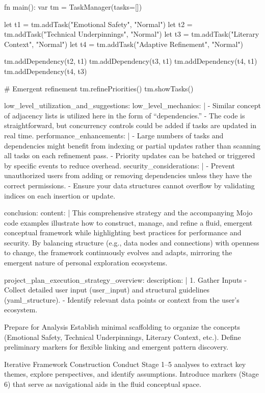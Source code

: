 {    fn main():
        var tm = TaskManager(tasks=[])

        let t1 = tm.addTask("Emotional Safety", "Normal")
        let t2 = tm.addTask("Technical Underpinnings", "Normal")
        let t3 = tm.addTask("Literary Context", "Normal")
        let t4 = tm.addTask("Adaptive Refinement", "Normal")

        tm.addDependency(t2, t1)
        tm.addDependency(t3, t1)
        tm.addDependency(t4, t1)
        tm.addDependency(t4, t3)

        # Emergent refinement
        tm.refinePriorities()
        tm.showTasks()

  low_level_utilization_and_suggestions:
    low_level_mechanics: |
      - Similar concept of adjacency lists is utilized here in the form of “dependencies.”
      - The code is straightforward, but concurrency controls could be added if tasks are updated in real time.
    performance_enhancements: |
      - Large numbers of tasks and dependencies might benefit from indexing or partial updates rather than scanning all tasks on each refinement pass.
      - Priority updates can be batched or triggered by specific events to reduce overhead.
    security_considerations: |
      - Prevent unauthorized users from adding or removing dependencies unless they have the correct permissions.
      - Ensure your data structures cannot overflow by validating indices on each insertion or update.

conclusion:
  content: |
    This comprehensive strategy and the accompanying Mojo code examples illustrate how to construct, manage, and refine a fluid, emergent conceptual framework while highlighting best practices for performance and security. By balancing structure (e.g., data nodes and connections) with openness to change, the framework continuously evolves and adapts, mirroring the emergent nature of personal exploration ecosystems.

project_plan_execution_strategy_overview:
  description: |
    1. Gather Inputs
       - Collect detailed user input ({{user_input}}) and structural guidelines ({{yaml_structure}}).
       - Identify relevant data points or context from the user’s ecosystem.

Prepare for Analysis
Establish minimal scaffolding to organize the concepts (Emotional Safety, Technical Underpinnings, Literary Context, etc.).
Define preliminary markers for flexible linking and emergent pattern discovery.

Iterative Framework Construction
Conduct Stage 1–5 analyses to extract key themes, explore perspectives, and identify assumptions.
Introduce markers (Stage 6) that serve as navigational aids in the fluid conceptual space.

}
